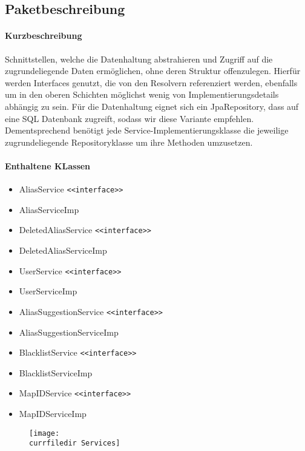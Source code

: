 \subsection*{Paketbeschreibung}%
\paragraph*{Kurzbeschreibung}
Schnittstellen, welche die Datenhaltung abstrahieren und Zugriff auf die zugrundeliegende Daten ermöglichen, ohne deren Struktur offenzulegen.
Hierfür werden Interfaces genutzt, die von den Resolvern referenziert werden, ebenfalls um in den oberen Schichten möglichst 
wenig von Implementierungsdetails abhängig zu sein. Für die Datenhaltung eignet sich ein JpaRepository, dass auf 
eine SQL Datenbank zugreift, sodass wir diese Variante empfehlen. Dementsprechend benötigt jede Service-Implementierungsklasse die jeweilige 
zugrundeliegende Repositoryklasse um ihre Methoden umzusetzen. 
\paragraph*{Enthaltene KLassen}
\begin{itemize}
    \item AliasService \texttt{<<interface>>}
    \item AliasServiceImp
    \item DeletedAliasService \texttt{<<interface>>}
    \item DeletedAliasServiceImp
    \item UserService \texttt{<<interface>>}
    \item UserServiceImp
    \item AliasSuggestionService \texttt{<<interface>>}
    \item AliasSuggestionServiceImp
    \item BlacklistService \texttt{<<interface>>}
    \item BlacklistServiceImp
    \item MapIDService \texttt{<<interface>>}
    \item MapIDServiceImp
\end{itemize}

\begin{figure}
    \centering
    \texttt{[image: \\currfiledir Services]}
\end{figure}

